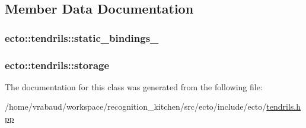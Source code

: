 \subsection{Member Data Documentation}
\hypertarget{classecto_1_1tendrils_a40635d009ae082dccde9486c1293212e}{
\subsubsection[{static\-\_\-bindings\-\_\-}]{ ecto\-::tendrils\-::static\-\_\-bindings\-\_\-\hspace{0.3cm}{\ttfamily [private]}}}\label{classecto_1_1tendrils_a40635d009ae082dccde9486c1293212e}
\hypertarget{classecto_1_1tendrils_afaa587298937ffa94ccfefc8a97b4edc}{
\subsubsection[{storage}]{ ecto\-::tendrils\-::storage\hspace{0.3cm}{\ttfamily [private]}}}\label{classecto_1_1tendrils_afaa587298937ffa94ccfefc8a97b4edc}


The documentation for this class was generated from the following file\-:\begin{DoxyCompactItemize}
\item 
/home/vrabaud/workspace/recognition\-\_\-kitchen/src/ecto/include/ecto/\hyperlink{tendrils_8hpp}{tendrils.\-hpp}\end{DoxyCompactItemize}
